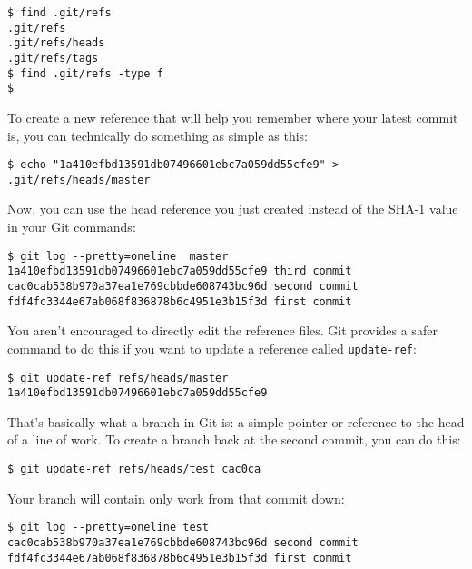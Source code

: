 \documentclass[a4paper]{book}
\begin{document}
\begin{shaded}\begin{verbatim}
$ find .git/refs
.git/refs
.git/refs/heads
.git/refs/tags
$ find .git/refs -type f
$
\end{verbatim}\end{shaded}

To create a new reference that will help you remember where your latest commit is, you can technically do something as simple as this:

\begin{shaded}\begin{verbatim}
$ echo "1a410efbd13591db07496601ebc7a059dd55cfe9" > .git/refs/heads/master
\end{verbatim}\end{shaded}

Now, you can use the head reference you just created instead of the SHA-1 value in your Git commands:

\begin{shaded}\begin{verbatim}
$ git log --pretty=oneline  master
1a410efbd13591db07496601ebc7a059dd55cfe9 third commit
cac0cab538b970a37ea1e769cbbde608743bc96d second commit
fdf4fc3344e67ab068f836878b6c4951e3b15f3d first commit
\end{verbatim}\end{shaded}

You aren't encouraged to directly edit the reference files. Git provides a safer command to do this if you want to update a reference called \texttt{update-ref}:

\begin{shaded}\begin{verbatim}
$ git update-ref refs/heads/master 1a410efbd13591db07496601ebc7a059dd55cfe9
\end{verbatim}\end{shaded}

That's basically what a branch in Git is: a simple pointer or reference to the head of a line of work. To create a branch back at the second commit, you can do this:

\begin{shaded}\begin{verbatim}
$ git update-ref refs/heads/test cac0ca
\end{verbatim}\end{shaded}

Your branch will contain only work from that commit down:

\begin{shaded}\begin{verbatim}
$ git log --pretty=oneline test
cac0cab538b970a37ea1e769cbbde608743bc96d second commit
fdf4fc3344e67ab068f836878b6c4951e3b15f3d first commit
\end{verbatim}\end{shaded}
\end{document}
